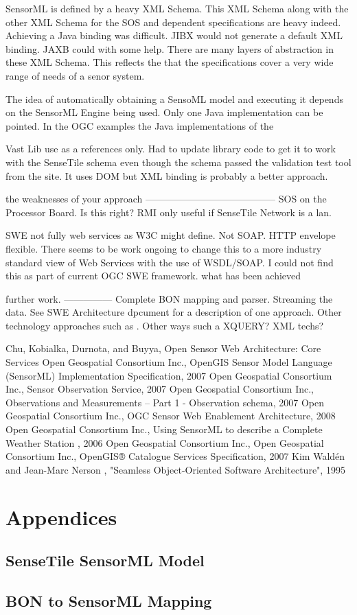 \documentclass[]{final_report}
\begin{document}
SensorML is defined by a heavy XML Schema. This XML Schema along with the other XML Schema for the SOS and dependent specifications are heavy indeed. Achieving a Java binding was difficult. JIBX would not generate a default XML binding. JAXB could with some help. There are many layers of abstraction in these XML Schema. This reflects the that the specifications cover a very wide range of needs of a senor system.

The idea of automatically obtaining a SensoML model and executing it depends on the SensorML Engine being used. Only one Java implementation can be pointed. In the OGC examples the Java implementations of the 

Vast Lib use as a references only.
Had to update library code to get it to work with the SenseTile schema even though the schema
passed the validation test tool from the site. It uses DOM but XML binding is probably a better approach.


the weaknesses of your approach
-----------------------------------------
SOS on the Processor Board. Is this right? RMI only useful if SenseTile Network is a lan.


SWE not fully web services as W3C might define. Not SOAP. HTTP envelope
flexible. There seems to be work ongoing to change this to a more industry standard view of Web Services with the use of WSDL/SOAP. I could not find this as part of current OGC SWE framework.
what has been achieved


further work.
---------------
Complete BON mapping and parser.
Streaming the data. See SWE Architecture dpcument for a description of one approach.
Other technology approaches such as . Other ways such a XQUERY? XML techs?

\newpage
\begin{thebibliography}{99}
 Chu, Kobialka,  Durnota, and  Buyya, Open Sensor Web Architecture: Core Services
Open Geospatial Consortium Inc., OpenGIS Sensor Model Language (SensorML) Implementation Specification, 2007
Open Geospatial Consortium Inc.,  Sensor Observation Service, 2007
Open Geospatial Consortium Inc., Observations and Measurements – Part 1 - Observation schema, 2007
Open Geospatial Consortium Inc., OGC Sensor Web Enablement Architecture, 2008
Open Geospatial Consortium Inc., Using SensorML to describe a
Complete Weather Station , 2006
Open Geospatial Consortium Inc.,
Open Geospatial Consortium Inc., OpenGIS® Catalogue Services Specification, 2007
Kim Waldén and Jean-Marc Nerson , "Seamless Object-Oriented Software Architecture", 1995
\end{thebibliography}
\label{endpage}


\chapter{Appendices}
\section{SenseTile SensorML Model}




\section{BON to SensorML Mapping}
\lstset{basicstyle=\scriptsize,showspaces=false,showstringspaces=false}

\end{document}

